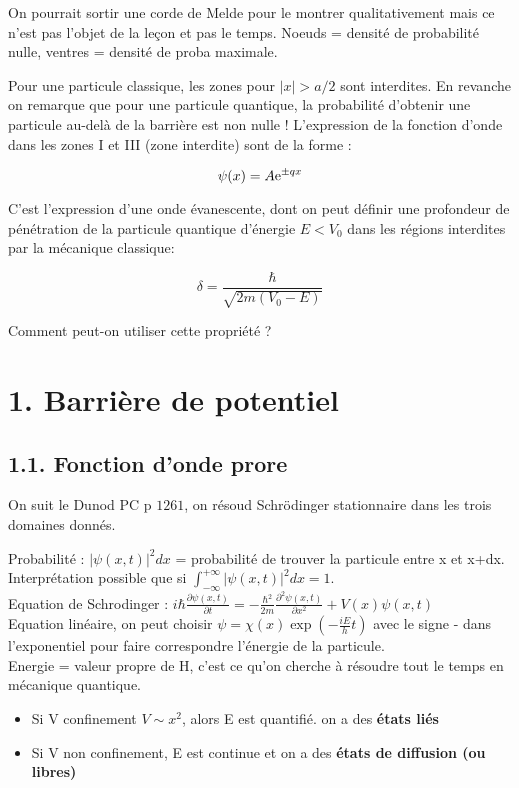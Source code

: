 \documentclass[french, a4paper, 10pt, twocolumn, landscape]{article}
\begin{document}
On pourrait sortir une corde de Melde pour le montrer qualitativement mais ce n'est pas l'objet de la leçon et pas le temps. Noeuds = densité de probabilité nulle, ventres = densité de proba maximale.

Pour une particule classique, les zones pour $|x|>a/2$ sont interdites. En revanche on remarque que pour une particule quantique, la probabilité d'obtenir une particule au-delà de la barrière est non nulle ! L'expression de la fonction d'onde dans les zones I et III (zone interdite) sont de la forme :

\begin{equation}
    \psi(x) = A{\rm e}^{\pm qx}
\end{equation}

C'est l'expression d'une onde évanescente, dont on peut définir une profondeur de pénétration de la particule quantique d'énergie $E<V_0$ dans les régions interdites par la mécanique classique:

\begin{equation}
    \delta = \dfrac{\hbar}{\sqrt{2m(V_0-E)}}
\end{equation}

Comment peut-on utiliser cette propriété ? 

\section*{1. Barrière de potentiel}

\subsection*{1.1. Fonction d'onde prore}
On suit le Dunod PC p $1261$, on résoud Schrödinger stationnaire dans les trois domaines donnés.


Probabilité : $|\psi(x,t)|^2dx$ = probabilité de trouver la particule entre x et x+dx. Interprétation possible que si $\int_{-\infty}^{+\infty}|\psi(x,t)|^2dx=1$.\\

Equation de Schrodinger : $i\hbar\frac{\partial \psi(x,t)}{\partial t}=-\frac{\hbar^2}{2m}\frac{\partial^2\psi(x,t)}{\partial x^2}+V(x)\psi(x,t)$\\

Equation linéaire, on peut choisir $\psi = \chi(x)\exp\left(-\frac{iE}{h}t\right)$ avec le signe - dans l'exponentiel pour faire correspondre l'énergie de la particule.\\

Energie = valeur propre de H, c'est ce qu'on cherche à résoudre tout le temps en mécanique quantique. 
\begin{itemize}
    \item Si V confinement $V\sim x^2$, alors E est quantifié. on a des \textbf{états liés}
    \item Si V non confinement, E est continue et on a des \textbf{états de diffusion (ou libres)}
\end{itemize}
\end{document}
